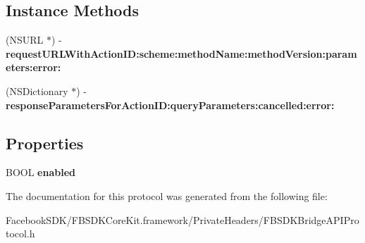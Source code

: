 \subsection*{Instance Methods}
\begin{DoxyCompactItemize}
\item 
\hypertarget{protocol_f_b_s_d_k_bridge_a_p_i_protocol-p_a5bdcaf5d671706dd9e4c6ad3c8af47d6}{(N\-S\-U\-R\-L $\ast$) -\/ {\bfseries request\-U\-R\-L\-With\-Action\-I\-D\-:scheme\-:method\-Name\-:method\-Version\-:parameters\-:error\-:}}\label{protocol_f_b_s_d_k_bridge_a_p_i_protocol-p_a5bdcaf5d671706dd9e4c6ad3c8af47d6}

\item 
\hypertarget{protocol_f_b_s_d_k_bridge_a_p_i_protocol-p_a22d1804f1d680c882ca420e48ccdd610}{(N\-S\-Dictionary $\ast$) -\/ {\bfseries response\-Parameters\-For\-Action\-I\-D\-:query\-Parameters\-:cancelled\-:error\-:}}\label{protocol_f_b_s_d_k_bridge_a_p_i_protocol-p_a22d1804f1d680c882ca420e48ccdd610}

\end{DoxyCompactItemize}
\subsection*{Properties}
\begin{DoxyCompactItemize}
\item 
\hypertarget{protocol_f_b_s_d_k_bridge_a_p_i_protocol-p_a67b0d1ef9f8816491656400192949134}{B\-O\-O\-L {\bfseries enabled}}\label{protocol_f_b_s_d_k_bridge_a_p_i_protocol-p_a67b0d1ef9f8816491656400192949134}

\end{DoxyCompactItemize}


The documentation for this protocol was generated from the following file\-:\begin{DoxyCompactItemize}
\item 
Facebook\-S\-D\-K/\-F\-B\-S\-D\-K\-Core\-Kit.\-framework/\-Private\-Headers/F\-B\-S\-D\-K\-Bridge\-A\-P\-I\-Protocol.\-h\end{DoxyCompactItemize}

